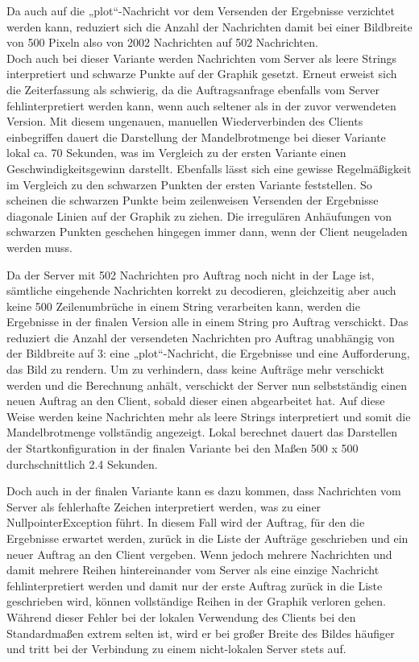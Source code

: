 \documentclass[12pt, onecolumn, notitlepage]{scrartcl}
\begin{document}
Da auch auf die „plot“-Nachricht vor dem Versenden der Ergebnisse verzichtet werden kann, reduziert sich die Anzahl der Nachrichten damit bei einer Bildbreite von 500 Pixeln also von 2002 Nachrichten auf 502 Nachrichten.\\
Doch auch bei dieser Variante werden Nachrichten vom Server als leere Strings interpretiert und schwarze Punkte auf der Graphik gesetzt. Erneut erweist sich die Zeiterfassung als schwierig, da die Auftragsanfrage ebenfalls vom Server fehlinterpretiert werden kann, wenn auch seltener als in der zuvor verwendeten Version. Mit diesem ungenauen, manuellen Wiederverbinden des Clients einbegriffen dauert die Darstellung der Mandelbrotmenge bei dieser Variante lokal ca. 70 Sekunden, was im Vergleich zu der ersten Variante einen Geschwindigkeitsgewinn darstellt. Ebenfalls lässt sich eine gewisse Regelmäßigkeit im Vergleich zu den schwarzen Punkten der ersten Variante feststellen. So scheinen die schwarzen Punkte beim zeilenweisen Versenden der Ergebnisse  diagonale Linien auf der Graphik zu ziehen. Die irregulären Anhäufungen von schwarzen Punkten geschehen hingegen immer dann, wenn der Client neugeladen werden muss. \par
Da der Server mit 502 Nachrichten pro Auftrag noch nicht in der Lage ist, sämtliche eingehende Nachrichten korrekt zu decodieren, gleichzeitig aber auch keine 500 Zeilenumbrüche in einem String verarbeiten kann, werden die Ergebnisse in der finalen Version alle in einem String pro Auftrag verschickt. Das reduziert die Anzahl der versendeten Nachrichten pro Auftrag unabhängig von der Bildbreite auf 3: eine „plot“-Nachricht, die Ergebnisse und eine Aufforderung, das Bild zu rendern. Um zu verhindern, dass keine Aufträge mehr verschickt werden und die Berechnung anhält, verschickt der Server nun selbstständig einen neuen Auftrag an den Client, sobald dieser einen abgearbeitet hat. Auf diese Weise werden keine Nachrichten mehr als leere Strings interpretiert und somit die Mandelbrotmenge vollständig angezeigt. Lokal berechnet dauert das Darstellen der Startkonfiguration in der finalen Variante bei den Maßen 500 x 500 durchschnittlich 2.4 Sekunden.\par

Doch auch in der finalen Variante kann es dazu kommen, dass Nachrichten vom Server als fehlerhafte Zeichen interpretiert werden, was zu einer NullpointerException führt. In diesem Fall wird der Auftrag, für den die Ergebnisse erwartet werden, zurück in die Liste der Aufträge geschrieben und ein neuer Auftrag an den Client vergeben. Wenn jedoch mehrere Nachrichten und damit mehrere Reihen hintereinander vom Server als eine einzige Nachricht fehlinterpretiert werden und damit nur der erste Auftrag zurück in die Liste geschrieben wird, können vollständige Reihen in der Graphik verloren gehen. Während dieser Fehler bei der lokalen Verwendung des Clients bei den Standardmaßen extrem selten ist, wird er bei großer Breite des Bildes häufiger und tritt bei der Verbindung zu einem nicht-lokalen Server stets auf. \par 
\end{document}
